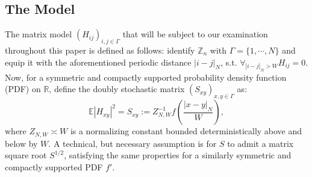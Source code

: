 \documentclass[11pt]{article}
\newcommand{\Z}{\mathbb{Z}}
\begin{document}
\subsection*{The Model}
\label{model}
The matrix model $(H_{ij})_{i, j\in \Gamma}$ that will be subject to our examination throughout this paper is defined as follows: identify $\Z_n$ with $\Gamma=\{1, \cdots, N\}$ and equip it with the aforementioned periodic distance $|i-j|_N$, s.t. $\forall_{|i-j|_N>W} H_{ij}=0$. Now, for a symmetric and compactly supported probability density function (PDF) on $\mathbb{R}$, define the doubly stochastic matrix $(S_{xy})_{x, y\in \Gamma}$ as: $$\mathbb{E}|H_{xy}|^2=S_{xy} := Z_{N, W}^{-1}f\left(\frac{|x-y|_N}{W}\right),$$
where $Z_{N, W}\asymp W$ is a normalizing constant bounded deterministically above and below by $W$. A technical, but necessary assumption is for $S$ to admit a matrix square root $S^{1/2}$, satisfying the same properties for a similarly symmetric and compactly supported PDF $f'$. \vspace{0.75 cm}
\begin{center}
\end{center}
\vspace{0.25 cm}
\end{document}
